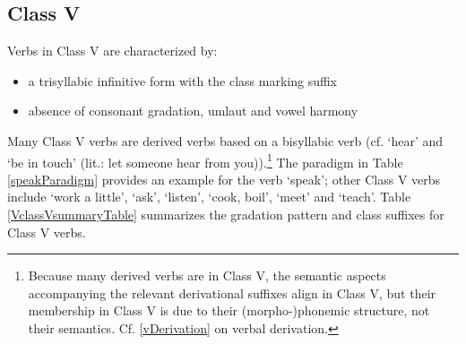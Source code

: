 
\subsection{Class V}\label{VclassV}
Verbs in Class V are characterized by: 
\begin{itemize}
\item{a trisyllabic infinitive form with the class marking suffix }
\item{absence of consonant gradation, umlaut and vowel harmony} 
\end{itemize}
Many Class V verbs are derived verbs based on a bisyllabic verb (cf.  ‘hear’ and  ‘be in touch’ (lit.: let someone hear from you)).\footnote{Because many derived verbs are in Class V, the semantic aspects accompanying the relevant derivational suffixes align in Class V, but their membership in Class V is due to their \mbox{(morpho-)phonemic} structure, not their semantics. Cf. \SEC\ref{vDerivation} on verbal derivation.} 
The paradigm in Table \vref{speakParadigm} provides an example for the verb  ‘speak’; 
other Class V verbs include  ‘work a little’,  ‘ask’,  ‘listen’,  ‘cook, boil’,  ‘meet’ and  ‘teach’. 
Table \vref{VclassVsummaryTable} summarizes the gradation pattern and class suffixes for Class V verbs. %
